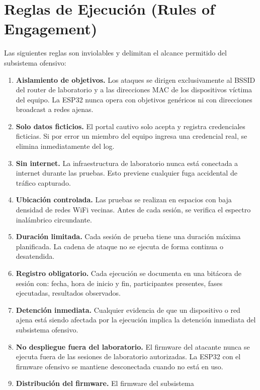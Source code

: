\documentclass[11pt,a4paper]{article}
\begin{document}
\section{Reglas de Ejecución (Rules of Engagement)}

Las siguientes reglas son inviolables y delimitan el alcance permitido del
subsistema ofensivo:

\begin{enumerate}
  \item \textbf{Aislamiento de objetivos.} Los ataques se dirigen
    exclusivamente al BSSID del router de laboratorio y a las direcciones
    MAC de los dispositivos víctima del equipo. La ESP32 nunca opera con
    objetivos genéricos ni con direcciones broadcast a redes ajenas.
  \item \textbf{Solo datos ficticios.} El portal cautivo solo acepta y
    registra credenciales ficticias. Si por error un miembro del equipo
    ingresa una credencial real, se elimina inmediatamente del log.
  \item \textbf{Sin internet.} La infraestructura de laboratorio nunca está
    conectada a internet durante las pruebas. Esto previene cualquier
    fuga accidental de tráfico capturado.
  \item \textbf{Ubicación controlada.} Las pruebas se realizan en espacios
    con baja densidad de redes WiFi vecinas. Antes de cada sesión, se
    verifica el espectro inalámbrico circundante.
  \item \textbf{Duración limitada.} Cada sesión de prueba tiene una duración
    máxima planificada. La cadena de ataque no se ejecuta de forma continua
    o desatendida.
  \item \textbf{Registro obligatorio.} Cada ejecución se documenta en una
    bitácora de sesión con: fecha, hora de inicio y fin, participantes
    presentes, fases ejecutadas, resultados observados.
  \item \textbf{Detención inmediata.} Cualquier evidencia de que un
    dispositivo o red ajena está siendo afectada por la ejecución implica
    la detención inmediata del subsistema ofensivo.
  \item \textbf{No despliegue fuera del laboratorio.} El firmware del
    atacante nunca se ejecuta fuera de las sesiones de laboratorio
    autorizadas. La ESP32 con el firmware ofensivo se mantiene desconectada
    cuando no está en uso.
  \item \textbf{Distribución del firmware.} El firmware del subsistema

\end{enumerate}
\end{document}
